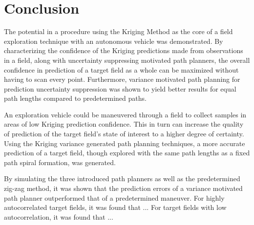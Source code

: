 \chapter*{Conclusion}
The potential in a procedure using the Kriging Method as the core of a field exploration technique with an autonomous vehicle was demonstrated. By characterizing the confidence of the Kriging predictions made from observations in a field, along with uncertainty suppressing motivated path planners, the overall confidence in prediction of a target field as a whole can be maximized without having to scan every point. Furthermore, variance motivated path planning for prediction uncertainty suppression was shown to yield better results for equal path lengths compared to predetermined paths.

An exploration vehicle could be maneuvered through a field to collect samples in areas of low Kriging prediction confidence. This in turn can increase the quality of prediction of the target field's state of interest to a higher degree of certainty. Using the Kriging variance generated path planning techniques, a more accurate prediction of a target field, though explored with the same path lengths as a fixed path spiral formation, was generated. 

By simulating the three introduced path planners as well as the predetermined zig-zag method, it was shown that the prediction errors of a variance motivated path planner outperformed that of a predetermined maneuver. For highly autocorrelated target fields, it was found that ... For target fields with low autocorrelation, it was found that ...

